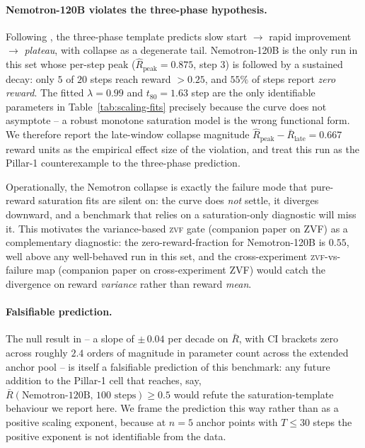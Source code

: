 \paragraph{Nemotron-120B violates the three-phase hypothesis.}
\label{par:nemotron-collapse}
Following \citet{nimmaturi2025predictive}, the three-phase
template predicts slow start $\to$ rapid improvement $\to$
\emph{plateau}, with collapse as a degenerate tail.  Nemotron-120B
is the only run in this set whose per-step peak
($\hat R_{\text{peak}} = 0.875$, step 3) is followed by a
sustained decay: only $5$ of $20$ steps reach reward $> 0.25$, and
$55\%$ of steps report \emph{zero reward}.  The fitted $\lambda
= 0.99$ and $t_{80} = 1.63$ step are the only identifiable
parameters in Table~\ref{tab:scaling-fits} precisely because the
curve does not asymptote -- a robust monotone saturation model is
the wrong functional form.  We therefore report the late-window
collapse magnitude
$\hat R_{\text{peak}} - \bar R_{\text{late}} = 0.667$ reward units
as the empirical effect size of the violation, and treat this run
as the Pillar-1 counterexample to the three-phase prediction.

Operationally, the Nemotron collapse is exactly the failure mode
that pure-reward saturation fits are silent on: the curve does
\emph{not} settle, it diverges downward, and a benchmark that
relies on a saturation-only diagnostic will miss it.  This
motivates the variance-based \textsc{zvf} gate
(companion paper on ZVF) as a complementary diagnostic: the
zero-reward-fraction for Nemotron-120B is $0.55$, well above any
well-behaved run in this set, and the cross-experiment
\textsc{zvf}-vs-failure map
(companion paper on cross-experiment ZVF) would catch the divergence on
reward \emph{variance} rather than reward \emph{mean}.

\paragraph{Falsifiable prediction.}
\label{par:scaling-prediction}
The null result in  -- a slope of
$\pm\,0.04$ per decade on $\bar R$, with CI brackets zero across
roughly $2.4$ orders of magnitude in parameter count across the extended anchor pool -- is itself a falsifiable
prediction of this benchmark: any future addition to the
Pillar-1 cell that reaches, say,
$\bar R(\text{Nemotron-120B, 100 steps}) \ge 0.5$ would refute
the saturation-template behaviour we report here.  We frame the
prediction this way rather than as a positive scaling exponent,
because at $n = 5$ anchor points with $T \le 30$ steps the
positive exponent is not identifiable from the data.

